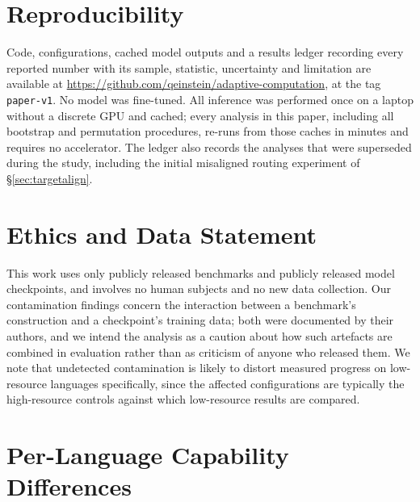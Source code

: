 \documentclass[11pt]{article}
\begin{document}
\section*{Reproducibility}
Code, configurations, cached model outputs and a results ledger recording every
reported number with its sample, statistic, uncertainty and limitation are
available at \url{https://github.com/qeinstein/adaptive-computation}, at the tag
\texttt{paper-v1}. No model was
fine-tuned. All inference was performed once on a laptop without a discrete GPU and
cached; every analysis in this paper, including all bootstrap and permutation
procedures, re-runs from those caches in minutes and requires no accelerator. The
ledger also records the analyses that were superseded during the study, including
the initial misaligned routing experiment of \S\ref{sec:targetalign}.

\section*{Ethics and Data Statement}
This work uses only publicly released benchmarks and publicly released model
checkpoints, and involves no human subjects and no new data collection. Our
contamination findings concern the interaction between a benchmark's construction
and a checkpoint's training data; both were documented by their authors, and we
intend the analysis as a caution about how such artefacts are combined in
evaluation rather than as criticism of anyone who released them. We note that
undetected contamination is likely to distort measured progress on low-resource
languages specifically, since the affected configurations are typically the
high-resource controls against which low-resource results are compared.




\appendix

\section{Per-Language Capability Differences}
\label{app:perlang}
\end{document}
